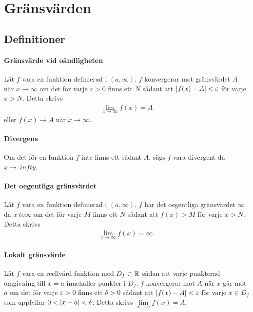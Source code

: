 \section{Gränsvärden}

\subsection{Definitioner}

\paragraph{Gränsvärde vid oändligheten}
Låt $f$ vara en funktion definierad i $(a, \infty)$. $f$ konvergerar mot gränsvärdet $A$ när $x\to\infty$ om det for varje $\varepsilon > 0$ finns ett $N$ sådant att $\abs{f(x) - A} < \varepsilon$ för varje $x > N$. Detta skrivs
\begin{align*}
	\lim_{x \to \infty} f(x) = A
\end{align*}
eller $f(x) \to A$ när $x \to \infty$.

\paragraph{Divergens}
Om det för en funktion $f$ inte finns ett sådant $A$, sägs $f$ vara divergent då $x \to \ infty$.

\paragraph{Det oegentliga gränsvärdet}
Låt $f$ vara en funktion definierad i $(a, \infty)$. $f$ har det oegentliga gränsvärdet $\infty$ då $x \ to \infty$ om det för varje $M$ finns ett $N$ sådant att $f(x) > M$ för varje $x > N$. Detta skrivs
\begin{align*}
	\lim_{x \to \infty} f(x) = \infty.
\end{align*}

\paragraph{Lokalt gränsvärde}
Låt $f$ vara en reellvärd funktion med $D_f\subset\mathbb{R}$ sådan att varje punkterad omgivning till $x = a$ innehåller punkter i $D_f$. $f$ konvergerar mot $A$ när $x$ går mot $a$ om det för varje $\varepsilon > 0$ finns ett $\delta > 0$ sådant att $\abs{f(x) - A} < \varepsilon$ för varje $x\in D_f$ som uppfyllar $0 < \abs{x - a} < \delta$. Detta skrivs $\lim\limits_{x\to a} f(x) = A$.


